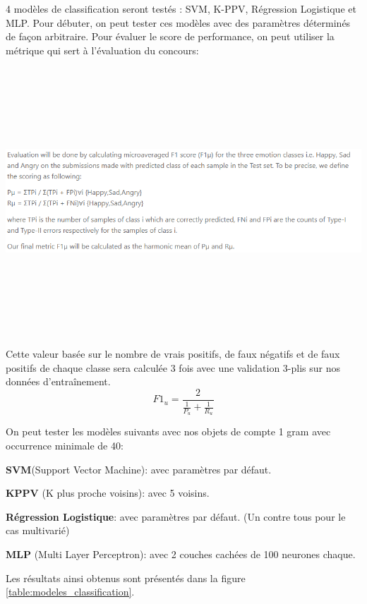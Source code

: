 4 modèles de classification seront testés : SVM, K-PPV, Régression Logistique et MLP. Pour débuter, on peut tester ces modèles avec des paramètres déterminés de façon arbitraire. Pour évaluer le score de performance, on peut utiliser la métrique qui sert à l'évaluation du concours:

\includegraphics[width=\linewidth,height=10cm,keepaspectratio]{images/metric_concour}

Cette valeur basée sur le nombre de vrais positifs, de faux négatifs et de faux positifs de chaque classe sera calculée 3 fois avec une validation 3-plis sur nos données d'entraînement.
\begin{equation}
F1_{u} =\frac{2}{\frac{1}{P_{u}}+\frac{1}{R_{u}}}
\end{equation}

On peut tester les modèles suivants avec nos objets de compte 1 gram avec occurrence minimale de 40:
\begin{description}
\item \textbf{SVM}(Support Vector Machine): avec paramètres par défaut.
\item \textbf{KPPV} (K plus proche voisins): avec 5 voisins.
\item \textbf{Régression Logistique}: avec paramètres par défaut. (Un contre tous pour le cas multivarié)
\item \textbf{MLP} (Multi Layer Perceptron): avec 2 couches cachées de 100 neurones chaque.
\end{description}

Les résultats ainsi obtenus sont présentés dans la figure \ref{table:modeles_classification}.

